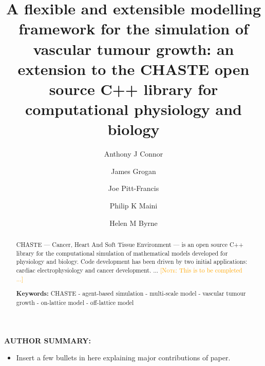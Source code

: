 \documentclass[superscriptaddress, a4paper]{article}
\newenvironment{authorsummary}
{\begin{framed} \begin{center} \begin{minipage}{0.9\textwidth} \noindent}
{\end{minipage} \end{center} \end{framed}}
\newcommand\NOTE[1]{\textcolor{orange}{[\textsc{Note:} {#1}]}}
\begin{document}
\title{A flexible and extensible modelling framework for the simulation of vascular tumour growth: an extension to the CHASTE open source C++ library for computational physiology and biology}


\author[1,2]{Anthony J Connor}
\author[1]{James Grogan}
\author[2]{Joe Pitt-Francis}
\author[1]{Philip K Maini}
\author[1,2]{Helen M Byrne}
 
  
\date{}
  
\maketitle

\begin{abstract}
CHASTE — Cancer, Heart And Soft Tissue Environment — is an open source C++ library for the computational simulation of mathematical models developed for physiology and biology. Code development has been driven by two initial applications: cardiac electrophysiology and cancer development. ... \NOTE{This is to be completed ...}

\smallskip
\noindent \textbf{Keywords:} CHASTE - agent-based simulation - multi-scale model - vascular tumour growth - on-lattice model - off-lattice model

\end{abstract}

\vspace{1.5cm}

\begin{authorsummary}

\textbf{AUTHOR SUMMARY:}

\begin{itemize}
 \item Insert a few bullets in here explaining major contributions of paper.
\end{itemize}

\end{authorsummary}

\newpage

\setcounter{tocdepth}{3}
\tableofcontents


\newpage

\doublespacing
\end{document}
